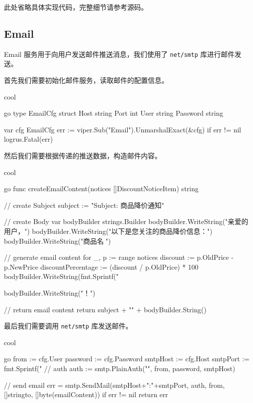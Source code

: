 此处省略具体实现代码，完整细节请参考源码。

\subsection{Email}

Email 服务用于向用户发送邮件推送消息，我们使用了 \texttt{net/smtp} 库进行邮件发送。

首先我们需要初始化邮件服务，读取邮件的配置信息。

\begin{codebox}{}{cool}
\begin{amzcode}{go}
type EmailCfg struct {
	Host     string
	Port     int
	User     string
	Password string
}

var cfg EmailCfg
err := viper.Sub("Email").UnmarshalExact(&cfg)
if err != nil {
    logrus.Fatal(err)
}
\end{amzcode}
\end{codebox}

然后我们需要根据传递的推送数据，构造邮件内容。

\begin{codebox}{}{cool}
\begin{amzcode}{go}
func createEmailContent(notices []DiscountNoticeItem) string {
	// create Subject
	subject := "Subject: 商品降价通知\n"

	// create Body
	var bodyBuilder strings.Builder
	bodyBuilder.WriteString("亲爱的用户，\n\n")
	bodyBuilder.WriteString("以下是您关注的商品降价信息：\n\n")
	bodyBuilder.WriteString("商品名称\t{}\t{}\n")

	// generate email content
	for _, p := range notices {
		discount := p.OldPrice - p.NewPrice
		discountPercentage := (discount / p.OldPrice) * 100
		bodyBuilder.WriteString(fmt.Sprintf("%
	}

	bodyBuilder.WriteString("！\n")

	// return email content
	return subject + "\n" + bodyBuilder.String()
}
\end{amzcode}
\end{codebox}

最后我们需要调用 \texttt{net/smtp} 库发送邮件。

\begin{codebox}{}{cool}
\begin{amzcode}{go}
from := cfg.User
password := cfg.Password
smtpHost := cfg.Host
smtpPort := fmt.Sprintf("%
// auth
auth := smtp.PlainAuth("", from, password, smtpHost)

// send email
err = smtp.SendMail(smtpHost+":"+smtpPort, auth, from, []string{to}, []byte(emailContent))
if err != nil {
    return err
}
\end{amzcode}
\end{codebox}

